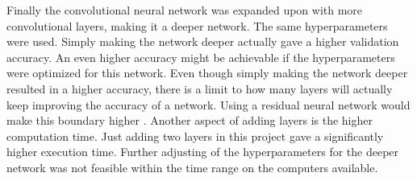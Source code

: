 Finally the convolutional neural network was expanded upon with more convolutional layers, making it a deeper network. The same hyperparameters were used. Simply making the network deeper actually gave a higher validation accuracy. An even higher accuracy might be achievable if the hyperparameters were optimized for this network. Even though simply making the network deeper resulted in a higher accuracy, there is a limit to how many layers will actually keep improving the accuracy of a network. Using a residual neural network would make this boundary higher \citep{resnet}. Another aspect of adding layers is the higher computation time. Just adding two layers in this project gave a significantly higher execution time. Further adjusting of the hyperparameters for the deeper network was not feasible within the time range on the computers available. 